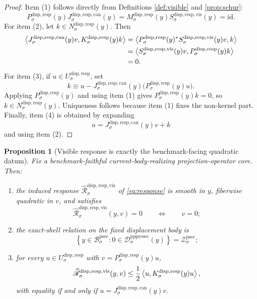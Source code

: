 \documentclass[11pt]{article}
\newcommand{\ProtoSectionBody}[1]{\mathcal B_{#1}^{\mathrm{psec}}}
\newcommand{\ProtoSectionShell}[1]{\mathcal Z_{#1}^{\mathrm{psec}}}
\newcommand{\PrePreProtoSectionResidualBody}[1]{\mathcal D_{#1}^{\mathrm{pppresec}}}
\newcommand{\CoreForcedBodyResponse}[1]{\widehat{\mathscr R}_{#1}^{\mathrm{disp,resp,vis}}}
\newcommand{\SubstrateCarrier}[1]{U_{#1}^{\mathrm{disp,resp}}}
\newcommand{\SubstrateProjection}[1]{P_{#1}^{\mathrm{disp,resp}}}
\newcommand{\SubstrateOperator}[1]{K_{#1}^{\mathrm{disp,resp}}}
\newcommand{\SubstrateKernel}[1]{N_{#1}^{\mathrm{disp,resp}}}
\newcommand{\SchurResponse}[1]{M_{#1}^{\mathrm{disp,resp}}}
\newcommand{\VisibleResponseOperator}[1]{S_{#1}^{\mathrm{disp,resp,vis}}}
\newcommand{\CanonicalLift}[1]{J_{#1}^{\mathrm{disp,resp,can}}}
\newtheorem{proposition}{Proposition}
\begin{document}
\begin{proof}
Item (1) follows directly from Definitions \ref{def:visible} and \ref{prop:schur}:
\[
\SubstrateProjection{\sigma}(y)\CanonicalLift{\sigma}(y)
=
\SchurResponse{\sigma}(y)\VisibleResponseOperator{\sigma}(y)
=
\mathrm{id}.
\]
For item (2), let \(k\in\SubstrateKernel{\sigma}(y)\). Then
\begin{align*}
\ev{
\CanonicalLift{\sigma}(y)v,
\SubstrateOperator{\sigma}(y)k
}
&=
\ev{
\SubstrateProjection{\sigma}(y)^*\VisibleResponseOperator{\sigma}(y)v,
k
} \\
&=
\ev{
\VisibleResponseOperator{\sigma}(y)v,
\SubstrateProjection{\sigma}(y)k
} \\
&= 0.
\end{align*}
For item (3), if \(u\in\SubstrateCarrier{\sigma}\), set
\[
k
\equiv
u-\CanonicalLift{\sigma}(y)\bigl(\SubstrateProjection{\sigma}(y)u\bigr).
\]
Applying \(\SubstrateProjection{\sigma}(y)\) and using item (1) gives \(\SubstrateProjection{\sigma}(y)k=0\), so \(k\in\SubstrateKernel{\sigma}(y)\). Uniqueness follows because item (1) fixes the non-kernel part. Finally, item (4) is obtained by expanding
\[
u=\CanonicalLift{\sigma}(y)v+k
\]
and using item (2).
\end{proof}

\begin{proposition}[Visible response is exactly the benchmark-facing quadratic datum]
\label{prop:visible}
Fix a benchmark-faithful current-body-realizing projection-operator core. Then:
\begin{enumerate}
    \item the induced response \(\CoreForcedBodyResponse{\sigma}\) of \eqref{eq:response} is smooth in \(y\), fiberwise quadratic in \(v\), and satisfies
    \[
    \CoreForcedBodyResponse{\sigma}(y,v)=0
    \qquad\Longleftrightarrow\qquad
    v=0;
    \]
    \item the exact-shell relation on the fixed displacement body is
    \[
    \left\{
    y\in\ProtoSectionBody{\sigma}:0\in\PrePreProtoSectionResidualBody{\sigma}(y)
    \right\}
    =
    \ProtoSectionShell{\sigma};
    \]
    \item for every \(u\in\SubstrateCarrier{\sigma}\) with \(v=\SubstrateProjection{\sigma}(y)u\),
    \[
    \CoreForcedBodyResponse{\sigma}(y,v)
    \le
    \frac{1}{2}\ev{u,\SubstrateOperator{\sigma}(y)u},
    \]
    with equality if and only if \(u=\CanonicalLift{\sigma}(y)v\).
\end{enumerate}
\end{proposition}
\end{document}
